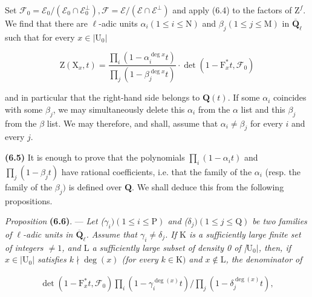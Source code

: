 \documentclass[10pt,leqno]{article}
\begin{document}
\noindent Set \(\mathcal{F} _{0}=\mathcal{E} _{0}/(\mathcal{E} _{0}\cap \mathcal{E} _{0}^{\perp }), \mathcal{F} =\mathcal{E} /(\mathcal{E} \cap \mathcal{E} ^{\perp })\) and apply (6.4) to the factors of \(\mathrm{Z}^{f}\). We find that there are \(\ell \)-adic units \(\alpha _{i} (1\leq i\leq \mathrm{N})\) and \(\beta _{j} (1\leq j\leq \mathrm{M})\) in \(\overline{\mathbf{Q}}_{\ell }\) such that for every \(x\in |\mathrm{U}_{0}|\)\par

\[\mathrm{Z}(\mathrm{X}_{x},t)=\frac{\prod\limits _{i}(1- \alpha _{i}^{\operatorname{deg} x}t)}{\prod\limits _{j}(1- \beta _{j}^{\operatorname{deg} x}t)}\cdot \operatorname{det}(1- \mathrm{F}_{x}^{*}t,\mathcal{F} _{0})\]

\noindent and in particular that the right-hand side belongs to \(\mathbf{Q}(t)\). If some \(\alpha _{i}\) coincides with some \(\beta _{j}\), we may simultaneously delete this \(\alpha _{i}\) from the \(\alpha \) list and this \(\beta _{j}\) from the \(\beta \) list. We may therefore, and shall, assume that \(\alpha _{i}\ne \beta _{j}\) for every \(i\) and every \(j\).\par

\noindent \textbf{(6.5)} It is enough to prove that the polynomials \(\prod _{i}(1- \alpha _{i} t)\) and \(\prod _{j}(1- \beta _{j} t)\) have rational coefficients, i.e. that the family of the \(\alpha _{i}\) (resp. the family of the \(\beta _{j})\) is defined over \(\mathbf{Q}\). We shall deduce this from the following propositions.\par

\noindent \emph{Proposition} \textbf{(6.6)}. — {\itshape Let (\(\gamma _{i}) (1\leq i\leq \mathrm{P})\) and (\(\delta _{j}) (1\leq j\leq \mathrm{Q})\) be two families of \(\ell \)-adic units in \(\overline{\mathbf{Q}}_{\ell }\). Assume that \(\gamma _{i}\ne \delta _{j}\). If \(\mathrm{K}\) is a sufficiently large finite set of integers \(\ne 1\), and \(\mathrm{L}\) a sufficiently large subset of density 0 of |\(\mathrm{U}_{0}|\), then, if \(x\in |\mathrm{U}_{0}|\) satisfies \(k\nmid \operatorname{deg}(x)\) (for every \(k\in \mathrm{K})\) and \(x\notin \mathrm{L}\), the denominator of}\par

\begin{equation*}\begin{gathered}\operatorname{det}(1- \mathrm{F}_{x}^{*}t,\mathcal{F} _{0})\prod _{i}(1- \gamma _{i}^{\operatorname{deg}(x)}t)/\prod _{j}(1- \delta _{j}^{\operatorname{deg}(x)}t),\end{gathered}\tag{6.6.1}\end{equation*}
\end{document}
